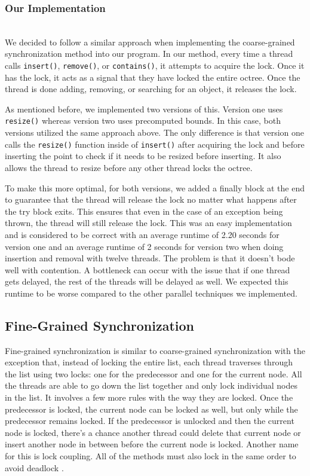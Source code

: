 \documentclass[conference]{IEEEtran}
\begin{document}
\subsubsection{Our Implementation}~\\
\indent \indent We decided to follow a similar approach when implementing the coarse-grained synchronization method into our program. In our method, every time a thread calls \verb|insert()|, \verb|remove()|, or \verb|contains()|, it attempts to acquire the lock. Once it has the lock, it acts as a signal that they have locked the entire octree. Once the thread is done adding, removing, or searching for an object, it releases the lock. 

\indent \indent As mentioned before, we implemented two versions of this. Version one uses \verb|resize()| whereas version two uses precomputed bounds. In this case, both versions utilized the same approach above. The only difference is that version one calls the \verb|resize()| function inside of \verb|insert()| after acquiring the lock and before inserting the point to check if it needs to be resized before inserting. It also allows the thread to resize before any other thread locks the octree.

\indent \indent To make this more optimal, for both versions, we added a finally block at the end to guarantee that the thread will release the lock no matter what happens after the try block exits. This ensures that even in the case of an exception being thrown, the thread will still release the lock. This was an easy implementation and is considered to be correct with an average runtime of 2.20 seconds for version one and an average runtime of 2 seconds for version two when doing insertion and removal with twelve threads. The problem is that it doesn't bode well with contention. A bottleneck can occur with the issue that if one thread gets delayed, the rest of the threads will be delayed as well. We expected this runtime to be worse compared to the other parallel techniques we implemented.

\subsection{Fine-Grained Synchronization}
Fine-grained synchronization is similar to coarse-grained synchronization with the exception that, instead of locking the entire list, each thread traverses through the list using two locks: one for the predecessor and one for the current node. All the threads are able to go down the list together and only lock individual nodes in the list. It involves a few more rules with the way they are locked. Once the predecessor is locked, the current node can be locked as well, but only while the predecessor remains locked. If the predecessor is unlocked and then the current node is locked, there’s a chance another thread could delete that current node or insert another node in between before the current node is locked. Another name for this is lock coupling. All of the methods must also lock in the same order to avoid deadlock \cite{textbook}.
\end{document}
